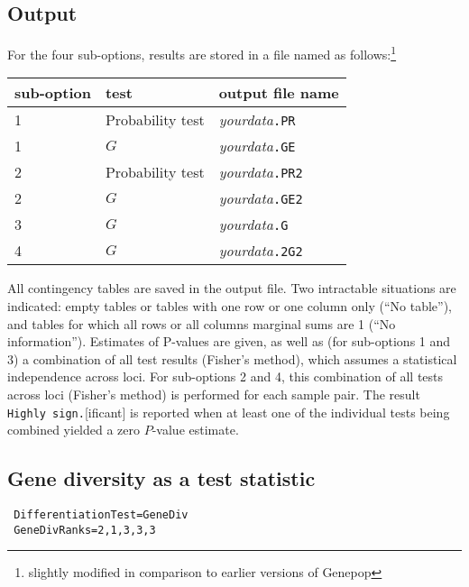 \documentclass[
  12pt,
]{book}
\begin{document}
\hypertarget{output-2}{%
\subsection{Output}\label{output-2}}

For the four sub-options, results are stored in a file named as follows:\footnote{slightly modified in comparison to earlier versions of Genepop}

\begin{longtable}[]{@{}lll@{}}
\toprule()
sub-option & test & output file name \\
\midrule()
\endhead
1 & Probability test & \emph{yourdata}\texttt{.PR} \\
1 & \(G\) & \emph{yourdata}\texttt{.GE} \\
2 & Probability test & \emph{yourdata}\texttt{.PR2} \\
2 & \(G\) & \emph{yourdata}\texttt{.GE2} \\
3 & \(G\) & \emph{yourdata}\texttt{.G} \\
4 & \(G\) & \emph{yourdata}\texttt{.2G2} \\
\bottomrule()
\end{longtable}

All contingency tables are saved in the output file. Two intractable situations are indicated: empty tables or tables with one row or one column only (``No table''), and tables for which all rows or all columns marginal sums are 1 (``No information''). Estimates of P-values are given, as well as (for sub-options 1 and 3) a combination of all test results (Fisher's method), which assumes a statistical independence across loci. For sub-options 2 and 4, this combination of all tests across loci (Fisher's method) is performed for each sample pair. The result \texttt{Highly\ sign.}{[}ificant{]} is reported when at least one of the individual tests being combined yielded a zero \(P\)-value estimate.

\hypertarget{gene-diversity-as-a-test-statistic}{%
\subsection{Gene diversity as a test statistic}\label{gene-diversity-as-a-test-statistic}}


\begin{verbatim}
 DifferentiationTest=GeneDiv
 GeneDivRanks=2,1,3,3,3
\end{verbatim}
\end{document}
